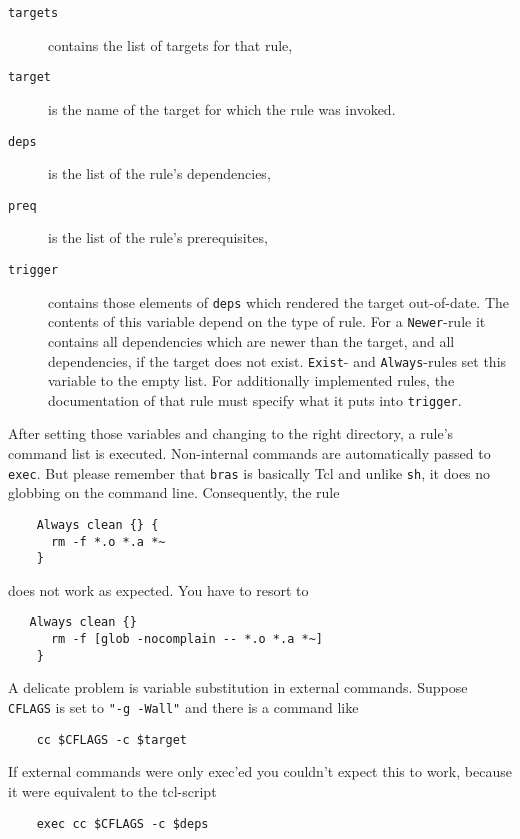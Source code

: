 \documentclass[12pt]{article}
\newcommand{\bras}{\texttt{bras}}
\begin{document}
\begin{description}
\item[\texttt{targets}] 
contains the list of targets for that rule,

\item[\texttt{target}] 
is the name of the target for which the rule
was invoked.

\item[\texttt{deps}] 
is the list of the rule's dependencies,

\item[\texttt{preq}] 
is the list of the rule's prerequisites,

\item[\texttt{trigger}]
contains those elements of \texttt{deps} which rendered the target
out-of-date. The contents of this variable depend on the type of
rule. For a \texttt{Newer}-rule it contains all dependencies which are
newer than the target, and all dependencies, if the target does not
exist. \texttt{Exist}- and \texttt{Always}-rules set this variable to
the empty list. For additionally implemented rules, the documentation
of that rule must specify what it puts into \texttt{trigger}.
\end{description}

After setting those variables and changing to the right directory, a
rule's command list is executed. Non-internal commands are
automatically passed to \texttt{exec}. But please remember that
\bras{} is basically Tcl and unlike \texttt{sh}, it does no globbing
on the command line. Consequently, the rule
\begin{verbatim}
    Always clean {} {
      rm -f *.o *.a *~
    }
\end{verbatim}
does not work as expected. You have to resort to
\begin{verbatim}
   Always clean {}
      rm -f [glob -nocomplain -- *.o *.a *~]
    }
\end{verbatim}
    
A delicate problem is variable substitution in
external commands. Suppose \texttt{CFLAGS} is set to 
\texttt{"-g -Wall"} and there is a command like 

\begin{verbatim}
    cc $CFLAGS -c $target
\end{verbatim}

If external commands were only exec'ed you couldn't expect this to
work, because it were equivalent to the tcl-script

\begin{verbatim}
    exec cc $CFLAGS -c $deps
\end{verbatim}
\end{document}
